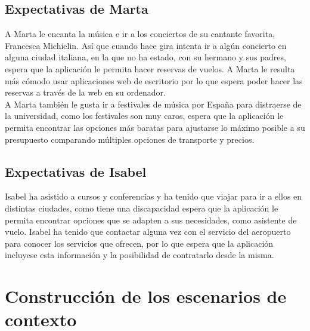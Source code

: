 \subsection{Expectativas de Marta}
A Marta le encanta la música e ir a los conciertos de su cantante favorita, Francesca Michielin. Así que cuando hace gira intenta ir a algún concierto en alguna 
ciudad italiana, en la que no ha estado, con su hermano y sus padres, espera que la aplicación le permita hacer reservas de vuelos. A Marta le resulta más cómodo 
usar aplicaciones web de escritorio por lo que espera poder hacer las reservas a través de la web en su ordenador. \\

A Marta también le gusta ir a festivales de música por España para distraerse de la universidad, como los festivales son muy caros, espera que la aplicación 
le permita encontrar las opciones más baratas para ajustarse lo máximo posible a su presupuesto comparando múltiples opciones de transporte y precios.


\subsection{Expectativas de Isabel}
Isabel ha asistido a cursos y conferencias y ha tenido que viajar para ir a ellos en distintas ciudades, como tiene una discapacidad espera que la aplicación 
le permita encontrar opciones que se adapten a sus necesidades, como asistente de vuelo. Isabel ha tenido que contactar alguna vez con el servicio del 
aeropuerto para conocer los servicios que ofrecen, por lo que espera que la aplicación incluyese esta información y la posibilidad de contratarlo desde la misma.

\section{Construcción de los escenarios de contexto}
